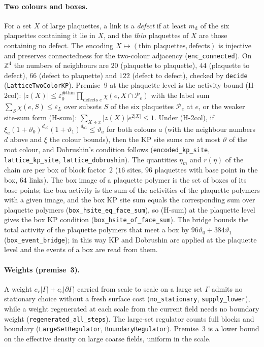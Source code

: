 \documentclass[11pt,a4paper]{article}
\theoremstyle{definition}
\theoremstyle{remark}
\newcommand{\lt}[1]{\texttt{#1}}
\begin{document}
\paragraph{Two colours and boxes.} For a set $X$ of large plaquettes, a link is a \emph{defect} if at least $m_{\mathrm d}$ of the six plaquettes containing it lie in $X$, and the \emph{thin} plaquettes of $X$ are those containing no defect. The encoding $X\mapsto(\text{thin plaquettes},\text{defects})$ is injective and preserves connectedness for the two-colour adjacency (\lt{enc\_\allowbreak{}connected}). On $\mathbb Z^4$ the numbers of neighbours are $20$ (plaquette to plaquette), $44$ (plaquette to defect), $66$ (defect to plaquette) and $122$ (defect to defect), checked by \lt{decide} (\lt{LatticeTwoColorKP}). Premise~9 at the plaquette level is the activity bound (H-2col): $|z(X)|\le\varepsilon_0^{\#\text{thin}}\prod_{\text{defects }e}\chi(e,X\cap\mathcal P_e)$ with the label sum $\sum_S\chi(e,S)\le\varepsilon_L$ over subsets $S$ of the six plaquettes $\mathcal P_e$ at $e$, or the weaker site-sum form (H-sum): $\sum_{X\ni x}|z(X)|e^{2|X|}\le1$. Under (H-2col), if $\xi_a(1+\vartheta_0)^{d_{a0}}(1+\vartheta_1)^{d_{a1}}\le\vartheta_a$ for both colours $a$ (with the neighbour numbers $d$ above and $\xi$ the colour bounds), then the KP site sums are at most $\vartheta$ of the root colour, and Dobrushin's condition follows (\lt{encoded\_\allowbreak{}kp\_\allowbreak{}site}, \lt{lattice\_\allowbreak{}kp\_\allowbreak{}site}, \lt{lattice\_\allowbreak{}dobrushin}). The quantities $\eta_m$ and $r(\eta)$ of the chain are per box of block factor~$2$ ($16$ sites, $96$ plaquettes with base point in the box, $64$ links). The box image of a plaquette polymer is the set of boxes of its base points; the box activity is the sum of the activities of the plaquette polymers with a given image, and the box KP site sum equals the corresponding sum over plaquette polymers (\lt{box\_\allowbreak{}hsite\_\allowbreak{}eq\_\allowbreak{}face\_\allowbreak{}sum}), so (H-sum) at the plaquette level gives the box KP condition (\lt{box\_\allowbreak{}hsite\_\allowbreak{}of\_\allowbreak{}face\_\allowbreak{}sum}). The bridge bounds the total activity of the plaquette polymers that meet a box by $96\vartheta_0+384\vartheta_1$ (\lt{box\_\allowbreak{}event\_\allowbreak{}bridge}); in this way KP and Dobrushin are applied at the plaquette level and the events of a box are read from them.

\paragraph{Weights (premise~3).} A weight $c_{\mathrm v}|\Gamma|+c_{\mathrm s}|\partial\Gamma|$ carried from scale to scale on a large set $\Gamma$ admits no stationary choice without a fresh surface cost (\lt{no\_\allowbreak{}stationary}, \lt{supply\_\allowbreak{}lower}), while a weight regenerated at each scale from the current field needs no boundary weight (\lt{regenerated\_\allowbreak{}all\_\allowbreak{}steps}). The large-set regulator counts full blocks and boundary (\lt{LargeSetRegulator}, \lt{BoundaryRegulator}). Premise~3 is a lower bound on the effective density on large coarse fields, uniform in the scale.
\end{document}
